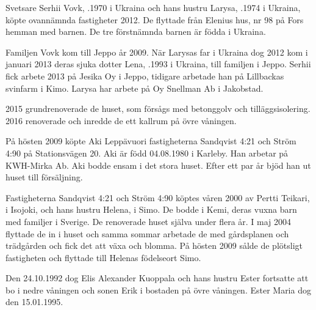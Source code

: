 Svetsare Serhii Vovk, .1970 i Ukraina och hans hustru Larysa, .1974 i Ukraina, köpte ovannämnda fastigheter 2012. De flyttade från Elenius hus, nr 98 på Fors hemman med barnen.	De tre förstnämnda barnen är födda i Ukraina.
\begin{jhchildren}
  \item {}
  \item {}
  \item {}
  \item {}
\end{jhchildren}

Familjen Vovk kom  till Jeppo år 2009. När Larysas far i Ukraina dog 	2012 kom i januari 2013 deras sjuka dotter Lena,  .1993 i Ukraina, till familjen i Jeppo. Serhii fick arbete 2013 på Jesika Oy i Jeppo, tidigare arbetade han på Lillbackas svinfarm i Kimo. Larysa har arbete på Oy Snellman Ab i	Jakobstad.

2015 grundrenoverade de huset, som försågs med betonggolv och tilläggsisolering. 2016 renoverade och inredde de ett kallrum på övre våningen.


På hösten 2009 köpte Aki Leppävuori fastigheterna Sandqvist 4:21 och Ström 4:90 på Stationsvägen 20. Aki är född 04.08.1980 i Karleby. Han arbetar på KWH-Mirka Ab. Aki bodde ensam i det stora huset. Efter	ett par år bjöd han ut huset till försäljning.


Fastigheterna Sandqvist 4:21 och Ström 4:90 köptes våren 2000 av	Pertti Teikari,  i Isojoki, och hans hustru Helena,  i Simo. De bodde i Kemi, deras vuxna barn med familjer i Sverige. De renoverade huset själva under flera år. I maj 2004 flyttade de in i huset och samma sommar arbetade de med gårdsplanen och	trädgården och fick det att växa och blomma. På hösten 2009 sålde de plötsligt fastigheten och flyttade till Helenas födelseort Simo.


Den 24.10.1992 dog Elis Alexander Kuoppala och hans hustru Ester fortsatte att bo i nedre våningen och sonen Erik i bostaden på övre våningen. Ester Maria dog den 15.01.1995.


